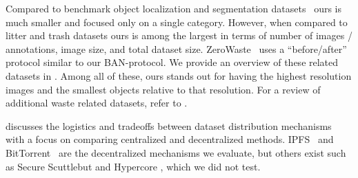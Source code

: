 \documentclass{article}
\begin{document}
Compared to benchmark object localization and segmentation datasets~\cite{ILSVRC15,
  lin_microsoft_2014,cordts2015cityscapes} ours is much smaller and focused only on a single category.
However, when compared to litter and trash datasets
  \cite{bashkirova_zerowaste_2022,proenca_taco_2020,hong2020trashcansemanticallysegmenteddatasetvisual,mittal2016spotgarbage,rs13050965}
  ours is among the largest in terms of number of images / annotations, image size, and total dataset size.
ZeroWaste~\cite{bashkirova_zerowaste_2022} uses a ``before/after'' protocol similar to our BAN-protocol.
We provide an overview of these related datasets in .
Among all of these, ours stands out for having the highest resolution images and the smallest objects
  relative to that resolution.
For a review of additional waste related datasets, refer to \cite{agnieszka_waste}.





 discusses the logistics and tradeoffs between dataset distribution mechanisms
  with a focus on comparing centralized and decentralized methods.
IPFS~\cite{cohen_incentives_2003} and BitTorrent~\cite{benet_ipfs_2014} are the decentralized 
  mechanisms we evaluate, but others exist such as Secure Scuttlebut \cite{tarr_secure_2019} and Hypercore
  \cite{frazee_dep-0002_nodate}, which we did not test.
\end{document}
